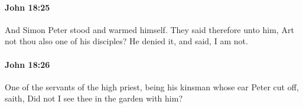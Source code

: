 		\paragraph{John 18:25} %
			\label{JOHN-18-25}

			And Simon Peter stood and warmed himself. They said therefore unto him, Art not thou also one of his disciples? He denied it, and said, I am not.

			\begin{framed}
				\scriptsize
				\begin{compactdesc}
					\item[SBLG] 
				\end{compactdesc}
			\end{framed}

		\paragraph{John 18:26} %
			\label{JOHN-18-26}

			One of the servants of the high priest, being his kinsman whose ear Peter cut off, saith, Did not I see thee in the garden with him?

